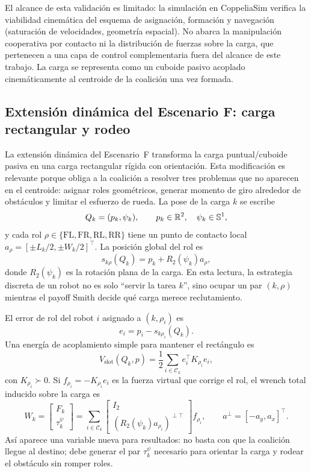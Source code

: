 El alcance de esta validación es limitado: la simulación en CoppeliaSim verifica la
viabilidad cinemática del esquema de asignación, formación y navegación (saturación de
velocidades, geometría espacial). No abarca la manipulación cooperativa por contacto ni
la distribución de fuerzas sobre la carga, que pertenecen a una capa de control
complementaria \citep{ebel2024cooperative, rosenfelder2024force} fuera del alcance de
este trabajo. La carga se representa como un cuboide pasivo acoplado cinemáticamente al
centroide de la coalición una vez formada.

\subsection{Extensión dinámica del Escenario F: carga rectangular y rodeo}
\label{subsec:escenario_f_rectangular}

La extensión dinámica del Escenario~F transforma la carga puntual/cuboide pasiva en una
carga rectangular rígida con orientación. Esta modificación es relevante porque obliga a
la coalición a resolver tres problemas que no aparecen en el centroide: asignar roles
geométricos, generar momento de giro alrededor de obstáculos y limitar el esfuerzo de
rueda. La pose de la carga $k$ se escribe
\[
  Q_k=(p_k,\psi_k),\qquad p_k\in\mathbb{R}^2,\quad \psi_k\in\mathbb{S}^1,
\]
y cada rol $\rho\in\{\mathrm{FL},\mathrm{FR},\mathrm{RL},\mathrm{RR}\}$ tiene un punto
de contacto local $a_\rho=[\pm L_k/2,\pm W_k/2]^\top$. La posición global del rol es
\begin{equation}
  s_{k\rho}(Q_k)=p_k+R_2(\psi_k)a_\rho,
  \label{eq:slot_rectangular}
\end{equation}
donde $R_2(\psi_k)$ es la rotación plana de la carga. En esta lectura, la estrategia
discreta de un robot no es solo ``servir la tarea $k$'', sino ocupar un par
$(k,\rho)$ mientras el payoff Smith decide qué carga merece reclutamiento.

El error de rol del robot $i$ asignado a $(k,\rho_i)$ es
\[
  e_i=p_i-s_{k\rho_i}(Q_k).
\]
Una energía de acoplamiento simple para mantener el rectángulo es
\begin{equation}
  V_{\mathrm{slot}}(Q_k,p)=
  \frac{1}{2}\sum_{i\in\mathcal{C}_k}
  e_i^\top K_{\rho_i}e_i ,
  \label{eq:energia_roles_rectangular}
\end{equation}
con $K_{\rho_i}\succ0$. Si $f_{\rho_i}=-K_{\rho_i}e_i$ es la fuerza virtual que corrige
el rol, el wrench total inducido sobre la carga es
\begin{equation}
  W_k=
  \begin{bmatrix} F_k\\ \tau_k^\psi\end{bmatrix}
  =
  \sum_{i\in\mathcal{C}_k}
  \begin{bmatrix}
    I_2\\
    (R_2(\psi_k)a_{\rho_i})^{\perp\top}
  \end{bmatrix}
  f_{\rho_i},
  \qquad a^\perp=[-a_y,a_x]^\top .
  \label{eq:wrench_rectangular}
\end{equation}
Así aparece una variable nueva para resultados: no basta con que la coalición llegue al
destino; debe generar el par $\tau_k^\psi$ necesario para orientar la carga y rodear el
obstáculo sin romper roles.

